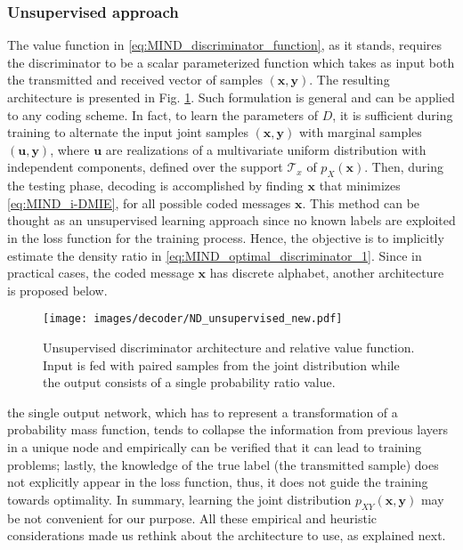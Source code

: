 \subsubsection{Unsupervised approach}
The value function in \eqref{eq:MIND_discriminator_function}, as it stands, requires the discriminator to be a scalar parameterized function which takes as input both the transmitted and received vector of samples $(\mathbf{x},\mathbf{y})$. The resulting architecture is presented in Fig. \ref{fig:MIND_unsupervised}. Such formulation is general and can be applied to any coding scheme. In fact, to learn the parameters of $D$, it is sufficient during training to alternate the input joint samples $(\mathbf{x},\mathbf{y})$ with marginal samples $(\mathbf{u},\mathbf{y})$, where $\mathbf{u}$ are realizations of a multivariate uniform distribution with independent components, defined over the support $\mathcal{T}_x$ of $p_X(\mathbf{x})$. Then, during the testing phase, decoding is accomplished by finding $\mathbf{x}$ that minimizes \eqref{eq:MIND_i-DMIE}, for all possible coded messages $\mathbf{x}$. This  method can be thought as an unsupervised learning approach since no known labels are exploited in the loss function for the training process. Hence, the objective is to implicitly estimate the density ratio in \eqref{eq:MIND_optimal_discriminator_1}.
Since in practical cases, the coded message $\mathbf{x}$ has discrete alphabet, another architecture is proposed below.

\begin{figure}
	\centering
	\texttt{[image: images/decoder/ND\_unsupervised\_new.pdf]}
	\caption{Unsupervised discriminator architecture and relative value function. Input is fed with paired samples from the joint distribution while the output consists of a single probability ratio value.}
	\label{fig:MIND_unsupervised}
\end{figure} 

the single output network, which has to represent a transformation of a probability mass function, tends to collapse the information from previous layers in a unique node and empirically can be verified that it can lead to training problems; lastly, the knowledge of the true label (the transmitted sample) does not explicitly appear in the loss function, thus, it does not guide the training towards optimality. In summary, learning the joint distribution $p_{XY}(\mathbf{x},\mathbf{y})$ may be not convenient for our purpose. All these empirical and heuristic considerations made us rethink about the architecture to use, as explained next. 

